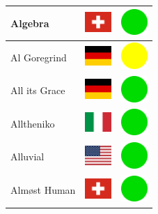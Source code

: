 \documentclass[12pt, a4paper, twoside]{report}
\begin{document}
\begin{center}
\begin{longtable}{|p{5cm}|p{2cm}|p{2cm}|}
 Algebra                                                    & \includegraphics[width=1cm]{../4x3/ch} &   \includegraphics[width=1cm]{../likes/y} \\ \hline
 Al Goregrind                                               & \includegraphics[width=1cm]{../4x3/de} &   \includegraphics[width=1cm]{../likes/m} \\ \hline
 All its Grace                                              & \includegraphics[width=1cm]{../4x3/de} &   \includegraphics[width=1cm]{../likes/y} \\ \hline
 Alltheniko                                                 & \includegraphics[width=1cm]{../4x3/it} &   \includegraphics[width=1cm]{../likes/y} \\ \hline
 Alluvial                                                   & \includegraphics[width=1cm]{../4x3/us} &   \includegraphics[width=1cm]{../likes/y} \\ \hline
 Almøst Human                                               & \includegraphics[width=1cm]{../4x3/ch} &   \includegraphics[width=1cm]{../likes/y} \\ \hline

\end{longtable}
\end{center}
\end{document}
